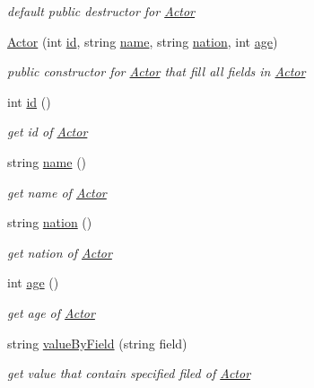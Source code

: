 \begin{DoxyCompactItemize}
\begin{DoxyCompactList}\small\item\em default public destructor for \hyperlink{classActor}{Actor} \end{DoxyCompactList}\item 
\hyperlink{classActor_ab6b4c8694911ae124e16b03506570a2f}{Actor} (int \hyperlink{classActor_a6da7fe13f5cee31d8d68ef04fb173fed}{id}, string \hyperlink{classActor_a28da8d9137bc756d0a878081f2f87e75}{name}, string \hyperlink{classActor_a10673442999877b7fa58b44e89867ec8}{nation}, int \hyperlink{classActor_a1b075c42ebb2a88e76c43dbb8de279db}{age})
\begin{DoxyCompactList}\small\item\em public constructor for \hyperlink{classActor}{Actor} that fill all fields in \hyperlink{classActor}{Actor} \end{DoxyCompactList}\item 
int \hyperlink{classActor_a6da7fe13f5cee31d8d68ef04fb173fed}{id} ()
\begin{DoxyCompactList}\small\item\em get id of \hyperlink{classActor}{Actor} \end{DoxyCompactList}\item 
string \hyperlink{classActor_a28da8d9137bc756d0a878081f2f87e75}{name} ()
\begin{DoxyCompactList}\small\item\em get name of \hyperlink{classActor}{Actor} \end{DoxyCompactList}\item 
string \hyperlink{classActor_a10673442999877b7fa58b44e89867ec8}{nation} ()
\begin{DoxyCompactList}\small\item\em get nation of \hyperlink{classActor}{Actor} \end{DoxyCompactList}\item 
int \hyperlink{classActor_a1b075c42ebb2a88e76c43dbb8de279db}{age} ()
\begin{DoxyCompactList}\small\item\em get age of \hyperlink{classActor}{Actor} \end{DoxyCompactList}\item 
string \hyperlink{classActor_a208ca77aceb8e6ac7f8a76b7ad1eb719}{value\+By\+Field} (string field)
\begin{DoxyCompactList}\small\item\em get value that contain specified filed of \hyperlink{classActor}{Actor} \end{DoxyCompactList}\end{DoxyCompactItemize}


